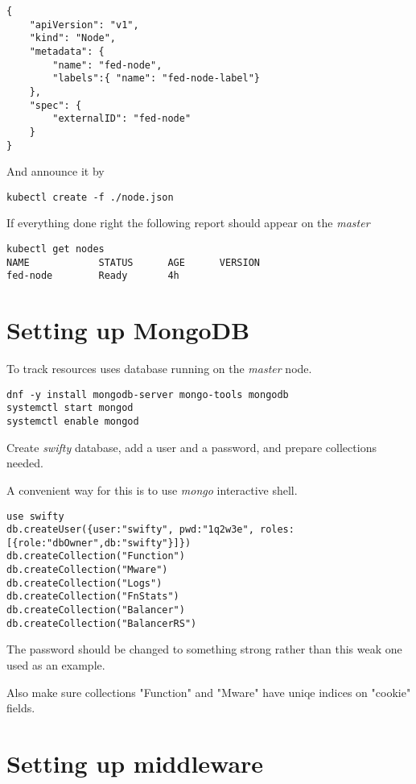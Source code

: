 \begin{lstlisting}
{
    "apiVersion": "v1",
    "kind": "Node",
    "metadata": {
        "name": "fed-node",
        "labels":{ "name": "fed-node-label"}
    },
    "spec": {
        "externalID": "fed-node"
    }
}
\end{lstlisting}

And announce it by
\begin{lstlisting}
kubectl create -f ./node.json
\end{lstlisting}

If everything done right the following report should
appear on the \emph{master} 

\begin{lstlisting}
kubectl get nodes
NAME            STATUS      AGE      VERSION
fed-node        Ready       4h
\end{lstlisting}

\section{Setting up MongoDB}
\label{sec:setup-mongodb}

To track resources  uses
 database
running on the \emph{master} node.

\begin{lstlisting}
dnf -y install mongodb-server mongo-tools mongodb
systemctl start mongod
systemctl enable mongod
\end{lstlisting}

Create \emph{swifty} database, add a user and a password,
and prepare collections needed.

A convenient way for this is to use \emph{mongo} interactive shell.

\begin{lstlisting}
use swifty
db.createUser({user:"swifty", pwd:"1q2w3e", roles:[{role:"dbOwner",db:"swifty"}]})
db.createCollection("Function")
db.createCollection("Mware")
db.createCollection("Logs")
db.createCollection("FnStats")
db.createCollection("Balancer")
db.createCollection("BalancerRS")
\end{lstlisting}

The password should be changed to something strong rather than
this weak one used as an example.

Also make sure collections "Function" and "Mware" have uniqe indices
on "cookie" fields.

\section{Setting up middleware}
\label{sec:setup-mware}

